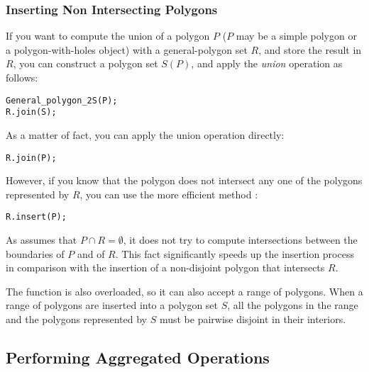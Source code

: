 
\subsubsection{Inserting Non Intersecting Polygons\label{bso_ssec:insert_ni}}

If you want to compute the union of a polygon $P$ ($P$ may be a simple
polygon or a polygon-with-holes object) with a general-polygon set
$R$, and store the result in $R$, you can construct a polygon set
$S(P)$, and apply the {\em union} operation as follows:
\begin{alltt}
  General_polygon_2 S (P);
  R.join (S);
\end{alltt}

As a matter of fact, you can apply the union operation directly:
\begin{alltt}
  R.join (P);
\end{alltt}

However, if you know that the polygon does not intersect any one of the
polygons represented by $R$, you can use the more efficient method
:
\begin{alltt}
  R.insert (P);
\end{alltt}

As  assumes that $P \cap R = \emptyset$, it does not try to
compute intersections between the boundaries of $P$ and of $R$. This
fact significantly speeds up the insertion process in comparison with the
insertion of a non-disjoint polygon that intersects $R$.

The  function is also overloaded, so it can also accept a
range of polygons. When a range of polygons are inserted into a
polygon set $S$, all the polygons in the range and the polygons represented 
by $S$ must be pairwise disjoint in their interiors.

\subsection{Performing Aggregated Operations\label{bso_ssec:agg_ops}}

